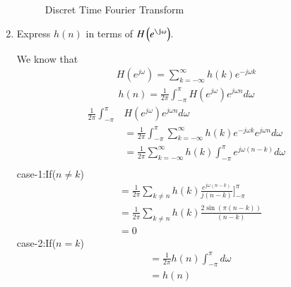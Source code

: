 \documentclass[journal,12pt,twocolumn]{IEEEtran}
\renewcommand\thesection{\arabic{section}}
\begin{document}
\begin{enumerate}[label=\thesection.\arabic*]
\begin{figure}[!ht]
\caption{Discret Time Fourier Transform}
\label{fig:dtft}
\end{figure}
\item Express $h(n)$ in terms of $H\brak{e^{\j \omega}}$.

\solution We know that 
\begin{align}
	H(e^{j\omega})=\sum_{k=-\infty}^\infty h(k)e^{-j\omega k}
\end{align}
\begin{align}
	h(n)=\frac{1}{2\pi}\int_{-\pi}^\pi H(e^{j\omega})e^{j\omega n}d\omega 
\end{align}
\begin{align}
\frac{1}{2\pi}\int_{-\pi}^\pi& H(e^{j\omega})e^{j\omega n}d\omega\\
 &=\frac{1}{2\pi}\int_{-\pi}^\pi \sum_{k=-\infty}^\infty h(k)e^{-j\omega k}e^{j\omega n}d\omega\\
 &=\frac{1}{2\pi} \sum_{k=-\infty}^\infty h(k)\int_{-\pi}^\pi e^{j\omega (n-k)}d\omega\\
\end{align}
 case-1:If($n\neq k$)
\begin{align}
 &=\frac{1}{2\pi} \sum_{k\neq n} h(k)\frac{e^{j\omega (n-k)}}{j(n-k)}\Biggr] _{-\pi}^\pi \\
 &=\frac{1}{2\pi} \sum_{k\neq n} h(k)\frac{2\sin(\pi(n-k))}{(n-k)}\\
 &=0
\end{align}
case-2:If($n=k$)
\begin{align}
	&=\frac{1}{2\pi}  h(n)\int_{-\pi}^\pi d\omega\\
	&=h(n)
\end{align}
\end{enumerate}
\end{document}
